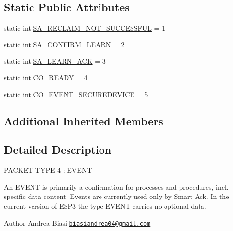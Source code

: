 \subsection*{Static Public Attributes}
\begin{DoxyCompactItemize}
\item 
static int \hyperlink{classit_1_1polito_1_1elite_1_1enocean_1_1protocol_1_1serial_1_1v3_1_1network_1_1packet_1_1event_1_1_event_a3404ff630833b2a03f45167dce1f94f1}{S\+A\+\_\+\+R\+E\+C\+L\+A\+I\+M\+\_\+\+N\+O\+T\+\_\+\+S\+U\+C\+C\+E\+S\+S\+F\+UL} = 1
\item 
static int \hyperlink{classit_1_1polito_1_1elite_1_1enocean_1_1protocol_1_1serial_1_1v3_1_1network_1_1packet_1_1event_1_1_event_a405bed0080c57812b7c6f43385a49d6c}{S\+A\+\_\+\+C\+O\+N\+F\+I\+R\+M\+\_\+\+L\+E\+A\+RN} = 2
\item 
static int \hyperlink{classit_1_1polito_1_1elite_1_1enocean_1_1protocol_1_1serial_1_1v3_1_1network_1_1packet_1_1event_1_1_event_aa156f52134f83d4f4c08ca1a58b75381}{S\+A\+\_\+\+L\+E\+A\+R\+N\+\_\+\+A\+CK} = 3
\item 
static int \hyperlink{classit_1_1polito_1_1elite_1_1enocean_1_1protocol_1_1serial_1_1v3_1_1network_1_1packet_1_1event_1_1_event_a155616d7d71b2e4590fe63de4f815dfc}{C\+O\+\_\+\+R\+E\+A\+DY} = 4
\item 
static int \hyperlink{classit_1_1polito_1_1elite_1_1enocean_1_1protocol_1_1serial_1_1v3_1_1network_1_1packet_1_1event_1_1_event_a6030815a3a2e94dd1461b6dc52a880bb}{C\+O\+\_\+\+E\+V\+E\+N\+T\+\_\+\+S\+E\+C\+U\+R\+E\+D\+E\+V\+I\+CE} = 5
\end{DoxyCompactItemize}
\subsection*{Additional Inherited Members}


\subsection{Detailed Description}
P\+A\+C\+K\+ET T\+Y\+PE 4 \+: E\+V\+E\+NT

An E\+V\+E\+NT is primarily a confirmation for processes and procedures, incl. specific data content. Events are currently used only by Smart Ack. In the current version of E\+S\+P3 the type E\+V\+E\+NT carries no optional data.

\begin{DoxyAuthor}{Author}
Andrea Biasi \href{mailto:biasiandrea04@gmail.com}{\tt biasiandrea04@gmail.\+com} 
\end{DoxyAuthor}


